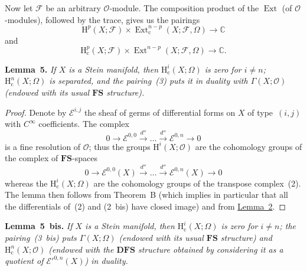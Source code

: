 \documentclass[british]{article}
\newenvironment{itenv}[1]
  {\phantomsection\par\smallskip\noindent\textbf{#1.}\itshape}
  {\par\smallskip}
\begin{document}
Now let \({\mathscr{F}}\) be an arbitrary \({\mathscr{O}}\)-module. The
composition product of the \(\operatorname{Ext}\) (of
\({\mathscr{O}}\)-modules), followed by the trace, gives us the pairings
\[
  \mathrm{H}^p(X;{\mathscr{F}}) \times \operatorname{Ext}_\mathrm{c}^{n-p}(X;{\mathscr{F}},\Omega)
  \to \mathbb{C}
\tag{3}
\] and \[
  \mathrm{H}_\mathrm{c}^p(X;{\mathscr{F}}) \times \operatorname{Ext}^{n-p}(X;{\mathscr{F}},\Omega)
  \to \mathbb{C}.
\tag{3~bis}
\]

\protect{}\label{lemma-5}
\begin{itenv}{Lemma 5}
If \(X\) is a Stein manifold, then \(\mathrm{H}_\mathrm{c}^i(X;\Omega)\)
is zero for \(i\neq n\); \(\mathrm{H}_\mathrm{c}^n(X;\Omega)\) is
separated, and the pairing~(3) puts it in duality with
\(\Gamma(X;{\mathscr{O}})\) (endowed with its usual \(\mathbf{FS}\)
structure).

\end{itenv}

\begin{proof}
Denote by \({\mathscr{E}}^{i,j}\) the sheaf of germs of differential
forms on \(X\) of type~\((i,j)\) with \(C^\infty\) coefficients. The
complex \[
  0 \to {\mathscr{E}}^{0,0} \xrightarrow{d''} \ldots \xrightarrow{d''} {\mathscr{E}}^{0,n} \to 0
\tag{1~bis}
\] is a fine resolution of \({\mathscr{O}}\); thus the groups
\(\mathrm{H}^i(X;{\mathscr{O}})\) are the cohomology groups of the
complex of \(\mathbf{FS}\)-spaces \[
  0 \to {\mathscr{E}}^{0,0}(X) \xrightarrow{d''} \ldots \xrightarrow{d''} {\mathscr{E}}^{0,n}(X) \to 0
\tag{2~bis}
\] whereas the \(\mathrm{H}_\mathrm{c}^i(X;\Omega)\) are the cohomology
groups of the transpose complex~(2). The lemma then follows from
Theorem~B (which implies in particular that all the differentials of~(2)
and (2~bis) have closed image) and from \hyperref[lemma-2]{Lemma~2}.
\end{proof}

\protect{}\label{lemma-5-bis}
\begin{itenv}{Lemma 5 bis}
If \(X\) is a Stein manifold, then \(\mathrm{H}_\mathrm{c}^i(X;\Omega)\)
is zero for \(i\neq n\); the pairing~(3~bis) puts \(\Gamma(X;\Omega)\)
(endowed with its usual \(\mathbf{FS}\) structure) and
\(\mathrm{H}_\mathrm{c}^n(X;{\mathscr{O}})\) (endowed with the
\(\mathbf{DFS}\) structure obtained by considering it as a quotient of
\({{\mathscr{E}}'}^{0,n}(X)\)) in duality.

\end{itenv}
\end{document}
